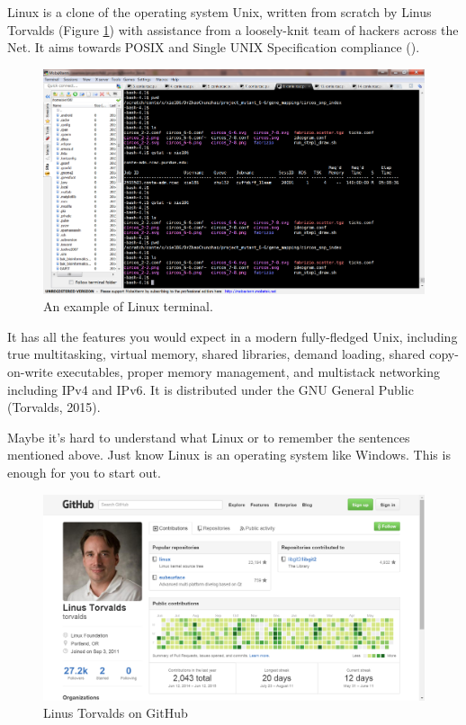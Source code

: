 \documentclass[]{book}
\begin{document}
Linux is a clone of the operating system Unix, written from scratch by Linus Torvalds (Figure \ref{fig:LinuxTerminal}) with assistance from a loosely-knit team of hackers across the Net. It aims towards POSIX and Single UNIX Specification compliance (\citet{Torvalds2015}).



\begin{figure}

{\centering \includegraphics[width=1\linewidth]{figures/linux_terminal_example} 

}

\caption{An example of Linux terminal.}\label{fig:LinuxTerminal}
\end{figure}

It has all the features you would expect in a modern fully-fledged Unix, including true multitasking, virtual memory, shared libraries, demand loading, shared copy-on-write executables, proper memory management, and multistack networking including IPv4 and IPv6. It is distributed under the GNU General Public (Torvalds, 2015).

Maybe it's hard to understand what Linux or to remember the sentences mentioned above. Just know Linux is an operating system like Windows. This is enough for you to start out.

\begin{figure}

{\centering \includegraphics[width=0.5\linewidth]{figures/Linus_Torvalds_GitHub} 

}

\caption{Linus Torvalds on GitHub}\label{fig:LinusTorvaldsGitHub}
\end{figure}
\end{document}
